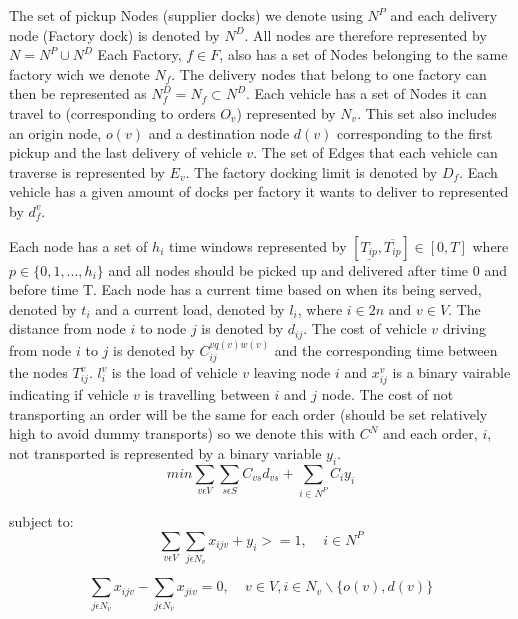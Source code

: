 \documentclass[a4paper,12pt]{article}
\begin{document}
The set of pickup Nodes (supplier docks) we denote using $N^P$ and each delivery node (Factory dock) is denoted by $N^D$. All nodes are therefore represented by $N = N^P \cup N^D$ Each Factory, $f \in F$, also has a set of Nodes belonging to the same factory wich we denote $N_f$. The delivery nodes that belong to one factory can then be represented as $N_f^D = N_f \subset N^D$. 
Each vehicle has a set of Nodes it can travel to (corresponding to orders $O_v$) represented by $N_v$. This set also includes an origin node, $o(v)$ and a destination node $d(v)$ corresponding to the first pickup and the last delivery of vehicle $v$. The set of Edges that each vehicle can traverse is represented by $E_v$. The factory docking limit is denoted by $D_f$. Each vehicle has a given amount of docks per factory it wants to deliver to represented by $d_{f}^v$. \par 
Each node has a set of $h_i$ time windows represented by $[ \underline{T_{ip}},  \overline{T_{ip}} ] \in [0,T]$ where $p \in \{0,1,...,h_i\}$ and all nodes should be picked up and delivered after time 0 and before time T. Each node has a current time based on when its being served, denoted by $t_{i}$ and a current load, denoted by $l_{i}$, where $i \in 2n$ and $v \in V$. The distance from node $i$ to node $j$ is denoted by $d_{ij}$. The cost of vehicle $v$ driving from node $i$ to $j$ is denoted by $C_{ij}^{vq(v)w(v)}$ and the corresponding time between the nodes $T_{ij}^v$. $l_{i}^v$ is the load of vehicle $v$ leaving node $i$ and $x_{ij}^v$ is a binary vairable indicating if vehicle $v$ is travelling between $i$ and $j$ node. The cost of not transporting an order will be the same for each order (should be set relatively high to avoid dummy transports) so we denote this with $C^N$ and each order, $i$,  not transported is represented by a binary variable $y_i$. 
\begin{equation}
\label{eq:1}
min\sum_{v\epsilon V} \sum_{s \epsilon S} C_{vs}d_{vs} + \sum_{i\in N^P}C_iy_i
\end{equation}

subject to:
\begin{equation} \label{eq:3}
    \sum_{v\epsilon V}\sum_{j\epsilon N_v}x_{ijv} + y_i >= 1, ~~~~~ i \in N^P
\end{equation}

\begin{equation} \label{eq:4}
    \sum_{j\epsilon N_v}x_{ijv} - \sum_{j\epsilon N_v}x_{jiv} = 0, ~~~~~ v \in V, i\in N_v \backslash \{o(v), d(v)\} 
\end{equation}
\end{document}
